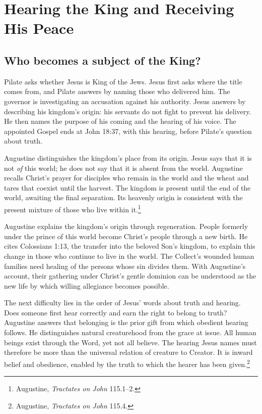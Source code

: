 \clearpage
\section{Hearing the King and Receiving His Peace}
\subsection{Who becomes a subject of the King?}
Pilate asks whether Jesus is King of the Jews. Jesus first asks where the title comes from, and Pilate answers by naming those who delivered him. The governor is investigating an accusation against his authority. Jesus answers by describing his kingdom's origin: his servants do not fight to prevent his delivery. He then names the purpose of his coming and the hearing of his voice. The appointed Gospel ends at John 18:37, with this hearing, before Pilate's question about truth.

Augustine distinguishes the kingdom's place from its origin. Jesus says that it is not \emph{of} this world; he does not say that it is absent from the world. Augustine recalls Christ's prayer for disciples who remain in the world and the wheat and tares that coexist until the harvest. The kingdom is present until the end of the world, awaiting the final separation. Its heavenly origin is consistent with the present mixture of those who live within it.\footnote{Augustine, \emph{Tractates on John} 115.1--2.}

Augustine explains the kingdom's origin through regeneration. People formerly under the prince of this world become Christ's people through a new birth. He cites Colossians 1:13, the transfer into the beloved Son's kingdom, to explain this change in those who continue to live in the world. The Collect's wounded human families need healing of the persons whose sin divides them. With Augustine's account, their gathering under Christ's gentle dominion can be understood as the new life by which willing allegiance becomes possible.

The next difficulty lies in the order of Jesus' words about truth and hearing. Does someone first hear correctly and earn the right to belong to truth? Augustine answers that belonging is the prior gift from which obedient hearing follows. He distinguishes natural creaturehood from the grace at issue. All human beings exist through the Word, yet not all believe. The hearing Jesus names must therefore be more than the universal relation of creature to Creator. It is inward belief and obedience, enabled by the truth to which the hearer has been given.\footnote{Augustine, \emph{Tractates on John} 115.4.}

